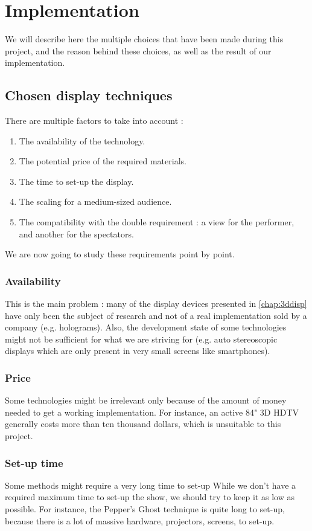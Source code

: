 \section{Implementation}
We will describe here the multiple choices that have been made during this project, and the reason behind these choices, as well as the result of our implementation.

\subsection{Chosen display techniques}
There are multiple factors to take into account : 
\begin{enumerate}
\item The availability of the technology.
\item The potential price of the required materials.
\item The time to set-up the display.
\item The scaling for a medium-sized audience.
\item The compatibility with the double requirement : a view for the performer, and another for the spectators.
\end{enumerate}

We are now going to study these requirements point by point.
\subsubsection{Availability}
This is the main problem : many of the display devices presented in \ref{chap:3ddisp} have only been the subject of research and not of a real implementation sold by a company (e.g. holograms). Also, the development state of some technologies  might not be sufficient for what we are striving for (e.g. auto stereoscopic displays which are only present in very small screens like smartphones).
\subsubsection{Price}
Some technologies might be irrelevant only because of the amount of money needed to get a working implementation. For instance, an active 84" 3D HDTV generally costs more than ten thousand dollars, which is unsuitable to this project.
\subsubsection{Set-up time}
Some methods might require a very long time to set-up While we don't have a required maximum time to set-up the show, we should try to keep it as low as possible. For instance, the Pepper's Ghost technique is quite long to set-up, because there is a lot of massive hardware, projectors, screens, to set-up.
